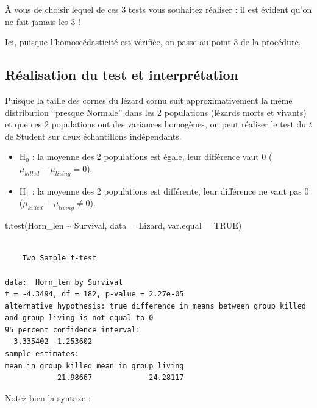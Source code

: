 \documentclass[
  french,
  a4paper,
  DIV=11,
  numbers=noendperiod,
  oneside]{scrreprt}
\newenvironment{Shaded}{}{}
\newcommand{\AttributeTok}[1]{\textcolor[rgb]{0.84,0.23,0.29}{#1}}
\newcommand{\ConstantTok}[1]{\textcolor[rgb]{0.00,0.36,0.77}{#1}}
\newcommand{\FunctionTok}[1]{\textcolor[rgb]{0.44,0.26,0.76}{#1}}
\newcommand{\NormalTok}[1]{\textcolor[rgb]{0.14,0.16,0.18}{#1}}
\newcommand{\SpecialCharTok}[1]{\textcolor[rgb]{0.00,0.36,0.77}{#1}}
\providecommand{\tightlist}{%
  \setlength{\itemsep}{0pt}\setlength{\parskip}{0pt}}
\begin{document}
À vous de choisir lequel de ces 3 tests vous souhaitez réaliser : il est
évident qu'on ne fait jamais les 3 !

Ici, puisque l'homoscédasticité est vérifiée, on passe au point 3 de la
procédure.

\subsection{Réalisation du test et interprétation}\label{sec-student}

Puisque la taille des cornes du lézard cornu suit approximativement la
même distribution ``presque Normale'' dans les 2 populations (lézards
morts et vivants) et que ces 2 populations ont des variances homogènes,
on peut réaliser le test du \(t\) de Student sur deux échantillons
indépendants.

\begin{itemize}
\tightlist
\item
  H\(_0\) : la moyenne des 2 populations est égale, leur différence vaut
  0 (\(\mu_{killed}-\mu_{living} = 0\)).
\item
  H\(_1\) : la moyenne des 2 populations est différente, leur différence
  ne vaut pas 0 (\(\mu_{killed}-\mu_{living} \neq 0\)).
\end{itemize}

\begin{Shaded}
\begin{Highlighting}[]
\FunctionTok{t.test}\NormalTok{(Horn\_len }\SpecialCharTok{\textasciitilde{}}\NormalTok{ Survival, }\AttributeTok{data =}\NormalTok{ Lizard, }\AttributeTok{var.equal =} \ConstantTok{TRUE}\NormalTok{)}
\end{Highlighting}
\end{Shaded}

\begin{verbatim}

    Two Sample t-test

data:  Horn_len by Survival
t = -4.3494, df = 182, p-value = 2.27e-05
alternative hypothesis: true difference in means between group killed and group living is not equal to 0
95 percent confidence interval:
 -3.335402 -1.253602
sample estimates:
mean in group killed mean in group living 
            21.98667             24.28117 
\end{verbatim}

Notez bien la syntaxe :
\end{document}
